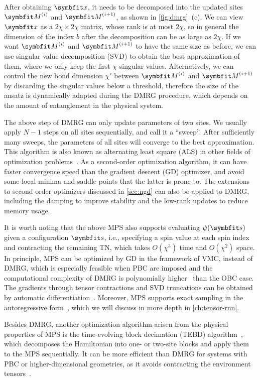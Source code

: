 After obtaining $\vx$, it needs to be decomposed into the updated sites $\mM^{(i)}$ and $\mM^{(i + 1)}$, as shown in \cref{fig:dmrg}~(c). We can view $\vx$ as a $2 \chi \times 2 \chi$ matrix, whose rank is at most $2 \chi$, so in general the dimension of the index $b$ after the decomposition can be as large as $2 \chi$. If we want $\mM^{(i)}$ and $\mM^{(i + 1)}$ to have the same size as before, we can use singular value decomposition (SVD) to obtain the best approximation of them, where we only keep the first $\chi$ singular values. Alternatively, we can control the new bond dimension $\chi'$ between $\mM^{(i)}$ and $\mM^{(i + 1)}$ by discarding the singular values below a threshold, therefore the size of the ansatz is dynamically adapted during the DMRG procedure, which depends on the amount of entanglement in the physical system.

The above step of DMRG can only update parameters of two sites. We usually apply $N - 1$ steps on all sites sequentially, and call it a ``sweep''. After sufficiently many sweeps, the parameters of all sites will converge to the best approximation. This algorithm is also known as alternating least square (ALS) in other fields of optimization problems~\cite{comon2009tensor, dolgov2015corrected}. As a second-order optimization algorithm, it can have faster convergence speed than the gradient descent (GD) optimizer, and avoid some local minima and saddle points that the latter is prone to. The extensions to second-order optimizers discussed in \cref{sec:ngd} can also be applied to DMRG, including the damping to improve stability and the low-rank updates to reduce memory usage.

It is worth noting that the above MPS also supports evaluating $\psi(\vs)$ given a configuration $\vs$, i.e., specifying a spin value at each spin index and contracting the remaining TN, which takes $O(\chi^3)$ time and $O(\chi^2)$ space. In principle, MPS can be optimized by GD in the framework of VMC, instead of DMRG, which is especially feasible when PBC are imposed and the computational complexity of DMRG is polynomially higher~\cite{sandvik2007variational} than the OBC case. The gradients through tensor contractions and SVD truncations can be obtained by automatic differentiation~\cite{liu2017gradient, liao2019differentiable}. Moreover, MPS supports exact sampling in the autoregressive form~\cite{ferris2012perfect, han2018unsupervised, wei2022sequential}, which we will discuss in more depth in \cref{ch:tensor-rnn}.

Besides DMRG, another optimization algorithm arisen from the physical properties of MPS is the time-evolving block decimation (TEBD) algorithm~\cite{vidal2003efficient}, which decomposes the Hamiltonian into one- or two-site blocks and apply them to the MPS sequentially. It can be more efficient than DMRG for systems with PBC or higher-dimensional geometries, as it avoids contracting the environment tensors~\cite{jiang2008accurate}.

